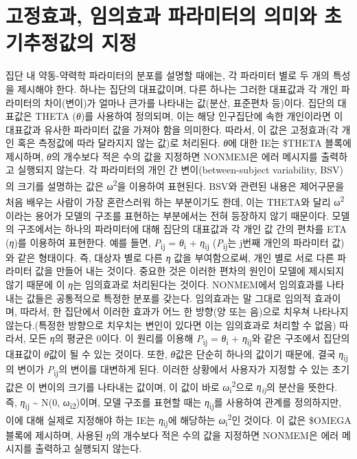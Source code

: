 \documentclass[
  11pt,
  krantz2, a4paper, twoside]{krantz}
\theoremstyle{definition}
\theoremstyle{definition}
\theoremstyle{definition}
\theoremstyle{remark}
\begin{document}
\hypertarget{fixed-random-meaning}{%
\section{고정효과, 임의효과 파라미터의 의미와 초기추정값의 지정}\label{fixed-random-meaning}}


집단 내 약동-약력학 파라미터의 분포를 설명할 때에는, 각 파라미터 별로 두 개의 특성을 제시해야 한다. 하나는 집단의 대표값이며, 다른 하나는 그러한 대표값과 각 개인 파라미터의 차이(변이)가 얼마나 큰가를 나타내는 값(분산, 표준편차 등)이다. 집단의 대표값은 THETA (\emph{θ})를 사용하여 정의되며, 이는 해당 인구집단에 속한 개인이라면 이 대표값과 유사한 파라미터 값을 가져야 함을 의미한다. 따라서, 이 값은 고정효과(각 개인 혹은 측정값에 따라 달라지지 않는 값)로 처리된다. \emph{θ}에 대한 IE는 \$THETA 블록에 제시하며, \emph{θ}의 개수보다 적은 수의 값을 지정하면 NONMEM은 에러 메시지를 출력하고 실행되지 않는다. 각 파라미터의 개인 간 변이(between-subject variability, BSV)의 크기를 설명하는 값은 ω\textsuperscript{2}을 이용하여 표현된다. BSV와 관련된 내용은 제어구문을 처음 배우는 사람이 가장 혼란스러워 하는 부분이기도 한데, 이는 THETA와 달리 ω\textsuperscript{2}이라는 용어가 모델의 구조를 표현하는 부분에서는 전혀 등장하지 않기 때문이다. 모델의 구조에서는 하나의 파라미터에 대해 집단의 대표값과 각 개인 값 간의 편차를 ETA (\emph{η})를 이용하여 표현한다. 예를 들면, \emph{P}\textsubscript{ij} = \emph{θ}\textsubscript{i} + \emph{η}\textsubscript{ij} (\emph{P}\textsubscript{ij}는 j번째 개인의 파라미터 값)와 같은 형태이다. 즉, 대상자 별로 다른 \emph{η} 값을 부여함으로써, 개인 별로 서로 다른 파라미터 값을 만들어 내는 것이다. 중요한 것은 이러한 편차의 원인이 모델에 제시되지 않기 때문에 이 \emph{η}는 임의효과로 처리된다는 것이다. NONMEM에서 임의효과를 나타내는 값들은 공통적으로 특정한 분포를 갖는다. 임의효과는 말 그대로 임의적 효과이며, 따라서, 한 집단에서 이러한 효과가 어느 한 방향(양 또는 음)으로 치우쳐 나타나지 않는다.(특정한 방향으로 치우치는 변인이 있다면 이는 임의효과로 처리할 수 없음) 따라서, 모든 \emph{η}의 평균은 0이다. 이 원리를 이용해 \emph{P}\textsubscript{ij} = \emph{θ}\textsubscript{i} + \emph{η}\textsubscript{ij}와 같은 구조에서 집단의 대표값이 \emph{θ}값이 될 수 있는 것이다. 또한, \emph{θ}값은 단순히 하나의 값이기 때문에, 결국 \emph{η}\textsubscript{ij}의 변이가 \emph{P}\textsubscript{ij}의 변이를 대변하게 된다. 이러한 상황에서 사용자가 지정할 수 있는 초기값은 이 변이의 크기를 나타내는 값이며, 이 값이 바로 \emph{ω}\textsubscript{i}\textsuperscript{2}으로 \emph{η\textsubscript{ij}}의 분산을 뜻한다. 즉, \emph{η}\textsubscript{ij} \textasciitilde{} N(0, \emph{ω}\textsubscript{i2})이며, 모델 구조를 표현할 때는 \emph{η}\textsubscript{ij}를 사용하여 관계를 정의하지만, 이에 대해 실제로 지정해야 하는 IE는 \emph{η}\textsubscript{ij}에 해당하는 \emph{ω}\textsubscript{i}\textsuperscript{2}인 것이다. 이 값은 \$OMEGA 블록에 제시하며, 사용된 \emph{η}의 개수보다 적은 수의 값을 지정하면 NONMEM은 에러 메시지를 출력하고 실행되지 않는다.
\end{document}
